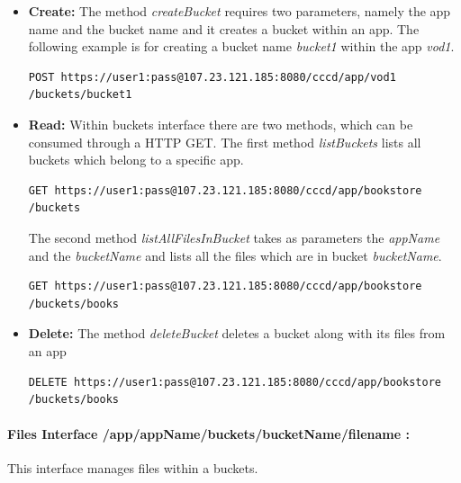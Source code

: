 \begin{itemize}
\item \textbf{Create:} The method \textit{createBucket} requires two parameters, namely the app name and the bucket name and it creates a bucket within an app. The following example is for creating a bucket name \textit{bucket1} within the app \textit{vod1}.

\begin{code}
\begin{verbatim}
POST https://user1:pass@107.23.121.185:8080/cccd/app/vod1
/buckets/bucket1
\end{verbatim}
\end{code}


\item \textbf{Read:} Within buckets interface there are two methods, which can be consumed through a \ac{HTTP} GET. The first method \textit{listBuckets} lists all buckets which belong to a specific app. 

\begin{code}
\begin{verbatim}
GET https://user1:pass@107.23.121.185:8080/cccd/app/bookstore
/buckets
\end{verbatim}
\end{code}

The second method \textit{listAllFilesInBucket} takes as parameters the \textit{appName} and the \textit{bucketName} and lists all the files which are in bucket \textit{bucketName}.

\begin{code}
\begin{verbatim}
GET https://user1:pass@107.23.121.185:8080/cccd/app/bookstore
/buckets/books
\end{verbatim}
\end{code}


\item \textbf{Delete:} The method \textit{deleteBucket} deletes a bucket along with its files from an app 

\begin{code}
\begin{verbatim}
DELETE https://user1:pass@107.23.121.185:8080/cccd/app/bookstore
/buckets/books
\end{verbatim}
\end{code}

\end{itemize}

\paragraph{Files Interface /app/{appName}/buckets/{bucketName}/{filename} :}  This interface manages files within a buckets.

